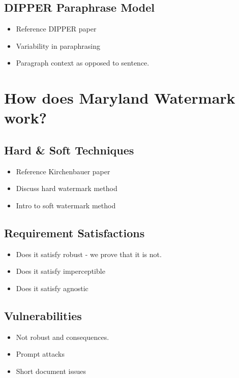 \documentclass{l4proj}
\theoremstyle{definition}
\begin{document}
    \subsection{DIPPER Paraphrase Model}
        \begin{itemize}
            \setlength\itemsep{0.5em}
            \item Reference DIPPER paper
            \item Variability in paraphrasing 
            \item Paragraph context as opposed to sentence. 
        \end{itemize}

\section{How does Maryland Watermark work?}
    \subsection{Hard \& Soft Techniques}
        \begin{itemize}
            \setlength\itemsep{0.5em}
            \item Reference Kirchenbauer paper
            \item Discuss hard watermark method 
            \item Intro to soft watermark method
        \end{itemize}
    \subsection{Requirement Satisfactions}
        \begin{itemize}
            \setlength\itemsep{0.5em}
            \item Does it satisfy robust - we prove that it is not.
            \item Does it satisfy imperceptible
            \item Does it satisfy agnostic 
        \end{itemize}
    \subsection{Vulnerabilities}
        \begin{itemize}
            \setlength\itemsep{0.5em}
            \item Not robust and consequences. 
            \item Prompt attacks 
            \item Short document issues
        \end{itemize}
\end{document}
